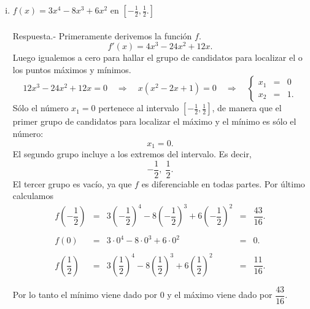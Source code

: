 \begin{enumerate}[\bfseries 1.]
\begin{enumerate}[(i)]
	    \item $f(x)=3x^4-8x^3+6x^2$ en $\left[-\frac{1}{2},\frac{1}{2}.\right]$\\\\
		Respuesta.-\; Primeramente derivemos la función $f$.
		$$f'(x)=4x^3-24x^2+12x.$$
		Luego igualemos a cero para hallar el grupo de candidatos para localizar el o los puntos máximos y mínimos.
		$$12x^3-24x^2+12x=0 \quad \Rightarrow \quad x(x^2-2x+1)=0\quad \Rightarrow \quad \left\{\begin{array}{rcl}x_1&=&0\\ x_2 &=& 1. \end{array}\right.$$
		Sólo el número $x_1=0$  pertenece al intervalo $[-\frac{1}{2},\frac{1}{2}]$, de manera que el primer grupo de candidatos para localizar el máximo y el mínimo es sólo el número:
		$$x_1=0.$$
		El segundo grupo incluye a los extremos del intervalo. Es decir,
		$$-\dfrac{1}{2},\;\dfrac{1}{2}.$$
		El tercer grupo es vacío, ya que $f$ es diferenciable en todas partes. Por último calculamos 
		$$\begin{array}{ccccl}
		    f\left(-\dfrac{1}{2}\right) &=& 3\left(-\dfrac{1}{2}\right)^4-8\left(-\dfrac{1}{2}\right)^3+ 6\left(-\dfrac{1}{2}\right)^2 &=&\dfrac{43}{16}.\\\\
		    f\left(0\right) &=& 3\cdot 0^4-8\cdot 0^3 + 6\cdot 0^2&=&0.\\\\
		    f\left(\dfrac{1}{2}\right) &=& 3\left(\dfrac{1}{2}\right)^4-8\left(\dfrac{1}{2}\right)^3+ 6\left(\dfrac{1}{2}\right)^2 &=&\dfrac{11}{16}.\\\\
		\end{array}$$
		Por lo tanto el mínimo viene dado por $0$ y el máximo viene dado por $\dfrac{43}{16}.$\\\\


\end{enumerate}
\end{enumerate}

